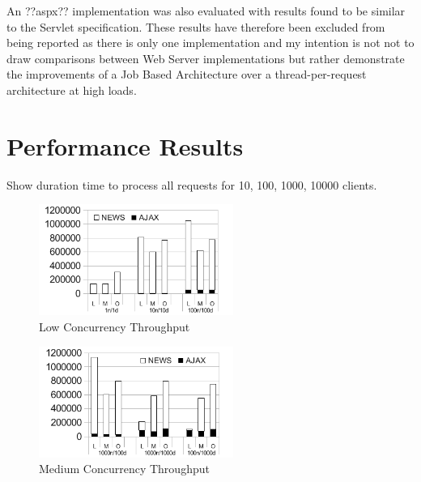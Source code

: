 \documentclass[conference]{ieee/IEEEtran}
\begin{document}
An ??aspx?? implementation was also evaluated with results found to be similar
to the Servlet specification.  These results have therefore been excluded from
being reported as there is only one implementation and my intention is not not
to draw comparisons between Web Server implementations but rather demonstrate
the improvements of a Job Based Architecture over a thread-per-request
architecture at high loads.
   
   

\section{Performance Results}
Show duration time to process all requests for 10, 100, 1000, 10000 clients.

 

\begin{figure}[!t]
\centering 
\includegraphics[width=2.5in]{LowConcurrencyThroughput}
\caption{Low Concurrency Throughput}
\label{fig:low_concurrency_throughput}
\end{figure}


\begin{figure}[!t]
\centering 
\includegraphics[width=2.5in]{MediumConcurrencyThroughput}
\caption{Medium Concurrency Throughput}
\label{fig:medium_concurrency_throughput}
\end{figure}
\end{document}
